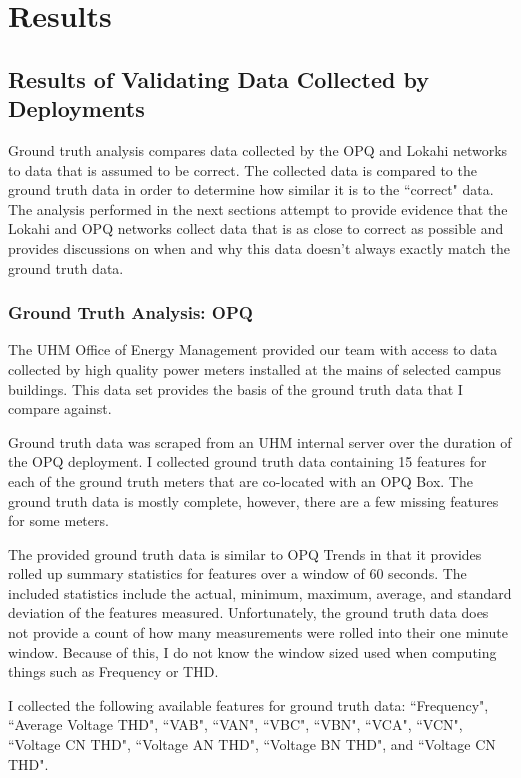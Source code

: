 \chapter{Results}\label{ch:results}

\section{Results of Validating Data Collected by Deployments}\label{sec:ground-truth-analysis}

Ground truth analysis compares data collected by the OPQ and Lokahi networks to data that is assumed to be correct. The collected data is compared to the ground truth data in order to determine how similar it is to the ``correct" data. The analysis performed in the next sections attempt to provide evidence that the Lokahi and OPQ networks collect data that is as close to correct as possible and provides discussions on when and why this data doesn't always exactly match the ground truth data.

\subsection{Ground Truth Analysis: OPQ}\label{subsec:ground-truth-analysis:-opq}

The UHM Office of Energy Management provided our team with access to data collected by high quality power meters installed at the mains of selected campus buildings. This data set provides the basis of the ground truth data that I compare against.

Ground truth data was scraped from an UHM internal server over the duration of the OPQ deployment. I collected ground truth data containing 15 features for each of the ground truth meters that are co-located with an OPQ Box. The ground truth data is mostly complete, however, there are a few missing features for some meters.

The provided ground truth data is similar to OPQ Trends in that it provides rolled up summary statistics for features over a window of 60 seconds. The included statistics include the actual, minimum, maximum, average, and standard deviation of the features measured. Unfortunately, the ground truth data does not provide a count of how many measurements were rolled into their one minute window. Because of this, I do not know the window sized used when computing things such as Frequency or THD.

I collected the following available features for ground truth data: ``Frequency", ``Average Voltage THD", ``VAB", ``VAN", ``VBC", ``VBN", ``VCA", ``VCN", ``Voltage CN THD", ``Voltage AN THD", ``Voltage BN THD", and ``Voltage CN THD".

